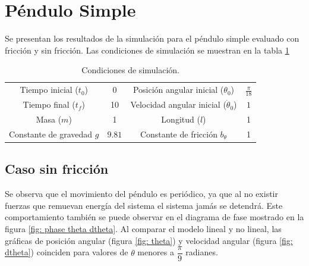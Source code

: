 \documentclass[12pt,letterpaper]{article}
\begin{document}
\section*{Péndulo Simple}

Se presentan los resultados de la simulación para el 
péndulo simple evaluado con fricción y sin fricción.
Las condiciones de simulación se muestran en la
tabla \ref{table: initial conditions}

\begin{table}[h]
\begin{center}
\centering
\begin{tabular}{cccc}
\hline
Tiempo inicial ($t_0$) & 0  & Posición angular inicial ($\theta_0$) & $\frac{\pi}{18}$ \\
Tiempo final ($t_f$) & 10 & Velocidad angular inicial ($\dot{\theta}_0$)& $1$\\
Masa ($m$) & 1 & Longitud ($l$) & 1\\
Constante de gravedad $g$ & $9.81$ & Constante de fricción $b_\theta$ & 1\\
\hline
\end{tabular}
\end{center}
 \caption{Condiciones de simulación.}
 \label{table: initial conditions}
\end{table}

\subsection*{Caso sin fricción}

Se observa que el movimiento del péndulo es periódico, 
ya que al no existir fuerzas que remuevan energía del sistema el sistema jamás se detendrá. 
Este comportamiento también se puede observar en el diagrama de fase mostrado en la figura \ref{fig: phase theta dtheta}.
Al comparar el modelo lineal y no lineal, las gráficas de posición angular  (figura {\ref{fig: theta}}) y velocidad angular (figura \ref{fig: dtheta}) coinciden para valores 
de $\theta$ menores a $\dfrac{\pi}{9}$ radianes.
\end{document}
